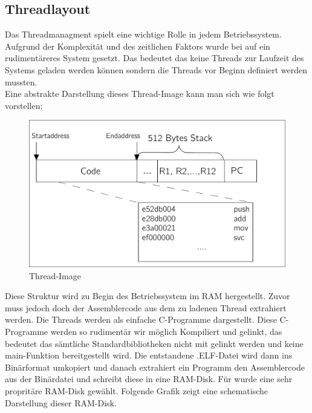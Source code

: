 \subsection{Threadlayout}
Das Threadmanagment spielt eine wichtige Rolle in jedem Betriebssystem. Aufgrund der Komplexit\"at und des zeitlichen Faktors wurde bei \mops auf ein rudiment\"areres System gesetzt. Das bedeutet das keine Threads zur Laufzeit des Systems geladen werden k\"onnen sondern die Threads vor Beginn definiert werden mussten.\\
Eine abstrakte Darstellung dieses Thread-Image kann man sich wie folgt vorstellen:
\begin{figure}[H]
	\begin{center}	
	\caption{Thread-Image}
	\includegraphics[scale=0.60]{common/threadimage.pdf}
	\end{center}
\end{figure}
\noindent
Diese Struktur wird zu Begin des Betriebssystem im RAM hergestellt. Zuvor muss jedoch doch der Assemblercode aus dem zu ladenen Thread extrahiert werden. Die Threads werden als einfache C-Programme dargestellt. Diese C-Programme werden so rudiment\"ar wir m\"oglich Kompiliert und gelinkt, das bedeutet das s\"amtliche Standardbibliotheken nicht mit gelinkt werden und keine main-Funktion bereitgestellt wird. Die entstandene .ELF-Datei wird dann ins Bin\"arformat umkopiert und danach extrahiert ein Programm den Assemblercode aus der Bin\"ardatei und schreibt diese in eine RAM-Disk. F\"ur \mops wurde eine sehr proprit\"are RAM-Disk gew\"ahlt. Folgende Grafik zeigt eine schematische Darstellung dieser RAM-Disk. 
